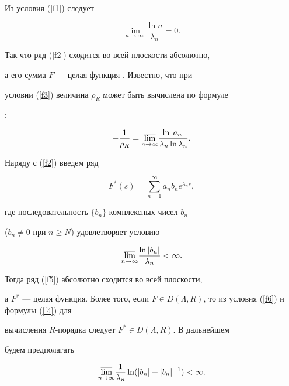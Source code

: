Из условия (\ref{f1}) следует


\begin{equation}\label{f3}


\lim_{n\to\infty}\frac{\ln n}{\lambda_{n}}=0.


\end{equation}


Так что ряд (\ref{f2}) сходится во всей плоскости абсолютно,


а его сумма $F$ --- целая функция \cite{lit1}. Известно, что при


условии (\ref{f3}) величина $\rho_{R}$ может быть вычислена по формуле


\cite{lit1}:


\begin{equation}\label{f4}


-\frac{1}{\rho_{R}}=\underset{n\to\infty}{\varlimsup}{}


\frac{\ln |a_{n}|}{\lambda_{n}\ln \lambda_{n}}.


\end{equation}





Наряду с (\ref{f2}) введем ряд


\begin{equation}\label{f5}


F^{*}(s)=\sum_{n=1}^{\infty}a_{n}b_{n}e^{\lambda_{n}s},


\end{equation}


где последовательность $\{b_{n}\}$ комплексных чисел $b_{n}$


($b_{n}\neq0$ при $n\geq N$) удовлетворяет условию


\begin{equation}\label{f6}


\underset{n\to\infty}{\varlimsup}{}\frac{\ln |b_{n}|}{\lambda_{n}}<\infty.


\end{equation}


Тогда ряд (\ref{f5}) абсолютно сходится во всей плоскости,


а $F^{*}$ --- целая функция. Более того, если $F\in


D(\Lambda,R)$, то  из условия (\ref{f6}) и формулы (\ref{f4}) для


вычисления $R$-порядка следует $F^{*}\in D(\Lambda,R)$. В дальнейшем


будем предполагать


\begin{equation}\label{f7}


\underset{n\to\infty}{\varlimsup}


\frac{1}{\lambda_{n}}\ln (|b_{n}|+|b_{n}|^{-1})<\infty.


\end{equation}


